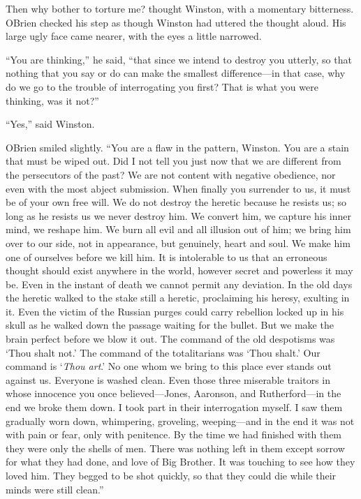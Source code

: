 Then why bother to torture me? thought Winston, with a momentary
bitterness. O\textquotesingle Brien checked his step as though Winston
had uttered the thought aloud. His large ugly face came nearer, with the
eyes a little narrowed.

``You are thinking,'' he said, ``that since we intend to destroy you
utterly, so that nothing that you say or do can make the smallest
difference---in that case, why do we go to the trouble of interrogating
you first? That is what you were thinking, was it not?''

``Yes,'' said Winston.

O\textquotesingle Brien smiled slightly. ``You are a flaw in the pattern,
Winston. You are a stain that must be wiped out. Did I not tell you just now
that we are different from the persecutors of the past? We are not content
with negative obedience, nor even with the most abject submission. When
finally you surrender to us, it must be of your own free will. We do not
destroy the heretic because he resists us; so long as he resists us we never
destroy him. We convert him, we capture his inner mind, we reshape him. We
burn all evil and all illusion out of him; we bring him over to our side,
not in appearance, but genuinely, heart and soul. We make him one of
ourselves before we kill him. It is intolerable to us that an erroneous
thought should exist anywhere in the world, however secret and powerless it
may be. Even in the instant of death we cannot permit any deviation. In the
old days the heretic walked to the stake still a heretic, proclaiming his
heresy, exulting in it. Even the victim of the Russian purges could carry
rebellion locked up in his skull as he walked down the passage waiting for
the bullet. But we make the brain perfect before we blow it out. The command
of the old despotisms was `Thou shalt not.' The command of the totalitarians
was `Thou shalt.' Our command is `\emph{Thou
  art}.' No one whom we bring to this place ever stands out
against us. Everyone is washed clean. Even those three miserable traitors in
whose innocence you once believed---Jones, Aaronson, and Rutherford---in the
end we broke them down. I took part in their interrogation myself. I saw
them gradually worn down, whimpering, groveling, weeping---and in the end it
was not with pain or fear, only with penitence. By the time we had finished
with them they were only the shells of men. There was nothing left in them
except sorrow for what they had done, and love of Big Brother. It was
touching to see how they loved him. They begged to be shot quickly, so that
they could die while their minds were still clean.''

